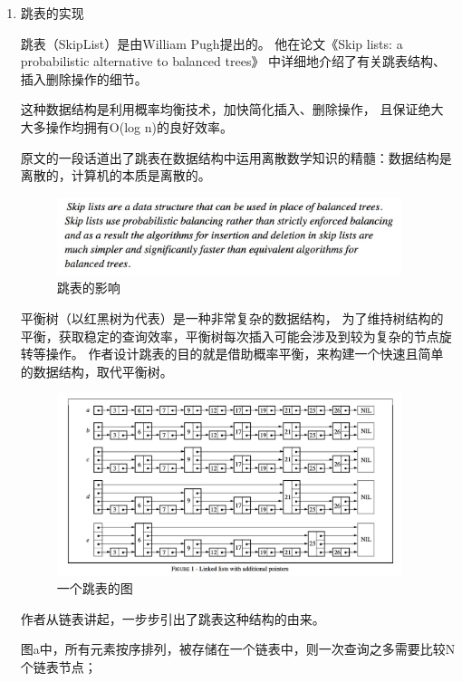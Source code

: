 	\begin{enumerate}
		\item 跳表的实现
		
		跳表（SkipList）是由William Pugh提出的。
		他在论文《Skip lists: a probabilistic alternative to balanced trees》
		中详细地介绍了有关跳表结构、插入删除操作的细节。

		这种数据结构是利用概率均衡技术，加快简化插入、删除操作，
		且保证绝大大多操作均拥有O(log n)的良好效率。
		
		原文的一段话道出了跳表在数据结构中运用离散数学知识的精髓：数据结构是离散的，计算机的本质是离散的。

		\begin{figure}[H]
			\centering
			\includegraphics[width=0.95\textwidth]{images/skiplist_effect}
			\caption{跳表的影响}
			\label{skiplist_effect}
		\end{figure}

		平衡树（以红黑树为代表）是一种非常复杂的数据结构，
		为了维持树结构的平衡，获取稳定的查询效率，平衡树每次插入可能会涉及到较为复杂的节点旋转等操作。
		作者设计跳表的目的就是借助概率平衡，来构建一个快速且简单的数据结构，取代平衡树。

		\begin{figure}[H]
			\centering
			\includegraphics[width=0.95\textwidth]{images/skiplist_intro}
			\caption{一个跳表的图}
			\label{skiplist_intro}
		\end{figure}

		作者从链表讲起，一步步引出了跳表这种结构的由来。

		图a中，所有元素按序排列，被存储在一个链表中，则一次查询之多需要比较N个链表节点；


\end{enumerate}
